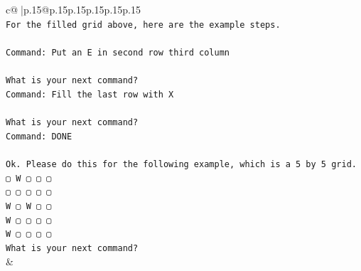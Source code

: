 \documentclass{article}
\begin{document}
{\begin{supertabular}{c@{$\;$}|p{.15\linewidth}@{}p{.15\linewidth}p{.15\linewidth}p{.15\linewidth}p{.15\linewidth}p{.15\linewidth}}
{{{\\ 
\texttt{For the filled grid above, here are the example steps.} \\
\\ 
\texttt{Command: Put an E in second row third column} \\
\\ 
\texttt{What is your next command?} \\
\texttt{Command: Fill the last row with X} \\
\\ 
\texttt{What is your next command?} \\
\texttt{Command: DONE} \\
\\ 
\texttt{Ok. Please do this for the following example, which is a 5 by 5 grid.} \\
\texttt{▢ W ▢ ▢ ▢} \\
\texttt{▢ ▢ ▢ ▢ ▢} \\
\texttt{W ▢ W ▢ ▢} \\
\texttt{W ▢ ▢ ▢ ▢} \\
\texttt{W ▢ ▢ ▢ ▢} \\
\texttt{What is your next command?} \\
            }
        }
    }
    & \\ \\


\end{supertabular}}
\end{document}
